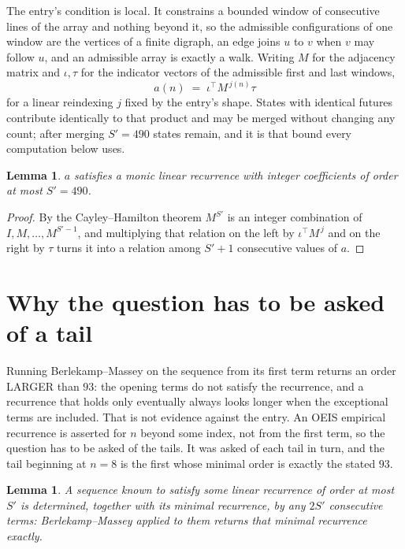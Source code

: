 \documentclass[11pt,a4paper]{article}
\theoremstyle{plain}
\newtheorem{lemma}[theorem]{Lemma}
\theoremstyle{definition}
\begin{document}
The entry's condition is local. It constrains a bounded window of consecutive lines of the
array and nothing beyond it, so the admissible configurations of one window are the vertices of
a finite digraph, an edge joins $u$ to $v$ when $v$ may follow $u$, and an admissible array is
exactly a walk. Writing $M$ for the adjacency matrix and $\iota,\tau$ for the indicator vectors
of the admissible first and last windows,
\[
a(n)\;=\;\iota^{\!\top}M^{\,j(n)}\tau
\]
for a linear reindexing $j$ fixed by the entry's shape. States with identical futures
contribute identically to that product and may be merged without changing any count; after
merging $S'=490$ states remain, and it is that bound every computation below uses.

\begin{lemma}\label{lem:cf}
$a$ satisfies a monic linear recurrence with integer coefficients of order at most $S'=490$.
\end{lemma}

\begin{proof}
By the Cayley--Hamilton theorem $M^{S'}$ is an integer combination of $I,M,\dots,M^{S'-1}$,
and multiplying that relation on the left by $\iota^{\!\top}M^{\,j}$ and on the right by
$\tau$ turns it into a relation among $S'+1$ consecutive values of $a$.
\end{proof}

\section{Why the question has to be asked of a tail}

Running Berlekamp--Massey on the sequence from its first term returns an order LARGER than $93$: the opening terms do not satisfy the recurrence, and a recurrence that holds only eventually always looks longer when the exceptional terms are included. That is not evidence against the entry. An OEIS empirical recurrence is asserted for $n$ beyond some index, not from the first term, so the question has to be asked of the tails. It was asked of each tail in turn, and the tail beginning at $n=8$ is the first whose minimal order is exactly the stated $93$.

\begin{lemma}\label{lem:bm}
A sequence known to satisfy some linear recurrence of order at most $S'$ is determined,
together with its minimal recurrence, by any $2S'$ consecutive terms: Berlekamp--Massey applied
to them returns that minimal recurrence exactly.
\end{lemma}
\end{document}
